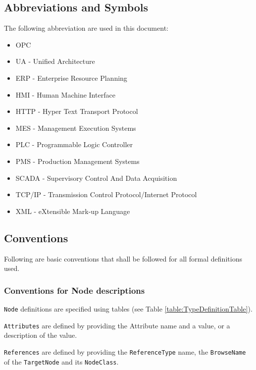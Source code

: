 \subsection{Abbreviations and Symbols}
The following abbreviation are used in this document:
\begin{itemize}
    \item OPC
    \item UA - Unified Architecture
    \item ERP - Enterprise Resource Planning
    \item HMI - Human Machine Interface
    \item HTTP - Hyper Text Transport Protocol
    \item MES - Management Execution Systems
    \item PLC - Programmable Logic Controller
    \item PMS - Production Management Systems
    \item SCADA - Supervisory Control And Data Acquisition
    \item TCP/IP - Transmission Control Protocol/Internet Protocol
    \item XML - eXtensible Mark-up Language
\end{itemize}

\subsection{Conventions}
Following are basic conventions that shall be followed for all formal definitions used.

\subsubsection{Conventions for Node descriptions}

\texttt{Node} definitions are specified using tables (see Table \ref{table:TypeDefinitionTable}).

\texttt{Attributes} are defined by providing the Attribute name and a value, or a description of the value.

\texttt{References} are defined by providing the \texttt{ReferenceType} name, the \texttt{BrowseName} of the \texttt{TargetNode} and its \texttt{NodeClass}.

